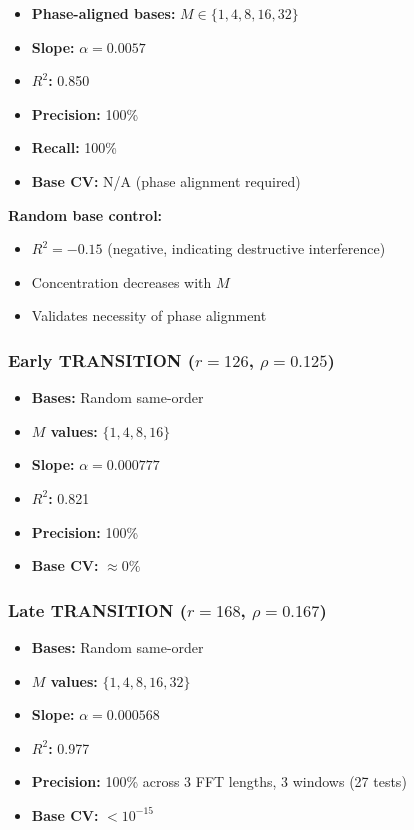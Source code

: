 \begin{itemize}
    \item \textbf{Phase-aligned bases:} $M \in \{1,4,8,16,32\}$
    \item \textbf{Slope:} $\alpha = 0.0057$
    \item \textbf{$R^2$:} 0.850
    \item \textbf{Precision:} 100\%
    \item \textbf{Recall:} 100\%
    \item \textbf{Base CV:} N/A (phase alignment required)
\end{itemize}

\textbf{Random base control:}
\begin{itemize}
    \item $R^2 = -0.15$ (negative, indicating destructive interference)
    \item Concentration decreases with $M$
    \item Validates necessity of phase alignment
\end{itemize}

\subsubsection{Early TRANSITION ($r=126$, $\rho=0.125$)}

\begin{itemize}
    \item \textbf{Bases:} Random same-order
    \item \textbf{$M$ values:} $\{1,4,8,16\}$
    \item \textbf{Slope:} $\alpha = 0.000777$
    \item \textbf{$R^2$:} 0.821
    \item \textbf{Precision:} 100\%
    \item \textbf{Base CV:} $\approx 0\%$
\end{itemize}

\subsubsection{Late TRANSITION ($r=168$, $\rho=0.167$)}

\begin{itemize}
    \item \textbf{Bases:} Random same-order
    \item \textbf{$M$ values:} $\{1,4,8,16,32\}$
    \item \textbf{Slope:} $\alpha = 0.000568$
    \item \textbf{$R^2$:} 0.977
    \item \textbf{Precision:} 100\% across 3 FFT lengths, 3 windows (27 tests)
    \item \textbf{Base CV:} $< 10^{-15}$
\end{itemize}


